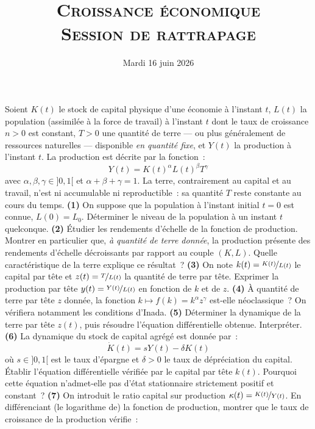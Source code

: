 \documentclass[11pt,a4paper,notitlepage,twocolumn]{article}
\begin{document}
\title{\textsc{Croissance économique\\ \small{Session de rattrapage}}}
\date{Mardi 16 juin 2026}

\maketitle
\thispagestyle{empty}

Soient $K(t)$ le stock de capital physique d'une économie à l'instant
$t$, $L(t)$ la population (assimilée à la force de travail) à l'instant
$t$ dont le taux de croissance $n>0$ est constant, $T>0$ une quantité
de terre — ou plus généralement de ressources naturelles —
disponible \emph{en quantité fixe}, et $Y(t)$ la production à
l'instant $t$. La production est décrite par la fonction~:
\[
Y(t) = K(t)^{\alpha}L(t)^{\beta}T^{\gamma}
\]
avec $\alpha,\beta,\gamma\in]0,1[$ et $\alpha+\beta+\gamma=1$. La
terre, contrairement au capital et au travail, n'est ni accumulable ni
reproductible~: sa quantité $T$ reste constante au cours du
temps. \textbf{(1)} On suppose que la population à l'instant initial
$t=0$ est connue, $L(0)=L_0$. Déterminer le niveau de la population à
un instant $t$ quelconque. \textbf{(2)} Étudier les rendements
d'échelle de la fonction de production. Montrer en particulier que,
\emph{à quantité de terre donnée}, la production présente des
rendements d'échelle décroissants par rapport au couple
$(K,L)$. Quelle caractéristique de la terre explique ce
résultat~? \textbf{(3)} On note $k(t)=\nicefrac{K(t)}{L(t)}$ le
capital par tête et $z(t)=\nicefrac{T}{L(t)}$ la quantité de terre par
tête. Exprimer la production par tête $y(t)=\nicefrac{Y(t)}{L(t)}$ en
fonction de $k$ et de $z$. \textbf{(4)} À quantité de terre par tête
$z$ donnée, la fonction $k\mapsto f(k)=k^{\alpha}z^{\gamma}$ est-elle
néoclassique~? On vérifiera notamment les conditions
d'Inada. \textbf{(5)} Déterminer la dynamique de la terre par tête
$z(t)$, puis résoudre l'équation différentielle obtenue. Interpréter.
\textbf{(6)} La dynamique du stock de capital agrégé est donnée par~:
\[
\dot K(t) = sY(t)-\delta K(t)
\]
où $s\in]0,1[$ est le taux d'épargne et $\delta>0$ le taux de
dépréciation du capital. Établir l'équation différentielle vérifiée
par le capital par tête $k(t)$. Pourquoi cette équation n'admet-elle
pas d'état stationnaire strictement positif et
constant~? \textbf{(7)} On introduit le ratio capital sur production
$\kappa(t)=\nicefrac{K(t)}{Y(t)}$. En différenciant (le logarithme de)
la fonction de production, montrer que le taux de croissance de la
production vérifie~:
\end{document}
